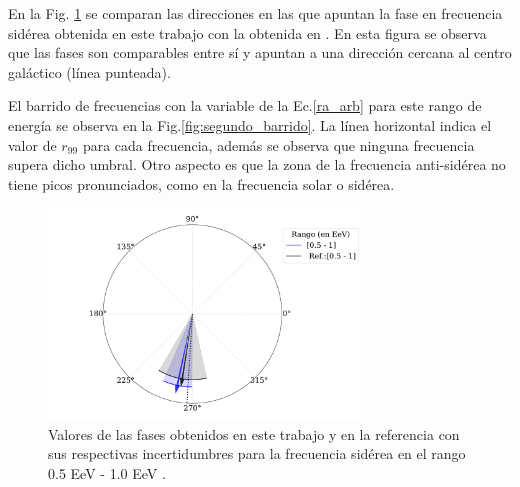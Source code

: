 \documentclass[11pt,papel,oneside,singlespace]{ibtesis}
\begin{document}
En la Fig. \ref{fig:segundo} se comparan las direcciones en las que apuntan la fase en frecuencia sidérea obtenida en este trabajo con la obtenida en \cite{Aab_2020}. En esta figura se observa que las fases son comparables entre sí y apuntan a una dirección cercana al centro galáctico (línea punteada).

El barrido de frecuencias con la variable de la Ec.\ref{ra_arb} para este rango de energía se observa en la Fig.\ref{fig:segundo_barrido}. La línea horizontal indica el valor de $r_{99}$ para cada frecuencia, además se observa que ninguna frecuencia supera dicho umbral. Otro aspecto es que la zona de la frecuencia anti-sidérea no tiene picos pronunciados, como en la frecuencia solar o sidérea.

\begin{figure}[H]
    \begin{small}
        \begin{center}
            \includegraphics[width=0.75\textwidth]{phase_segundo_bin.pdf}
        \end{center}
        \caption{Valores de las fases obtenidos en este trabajo y en la referencia con sus respectivas incertidumbres para la frecuencia sidérea en el  rango 0.5 EeV - 1.0 EeV .}
        \label{fig:segundo}
    \end{small}
\end{figure}
\end{document}
